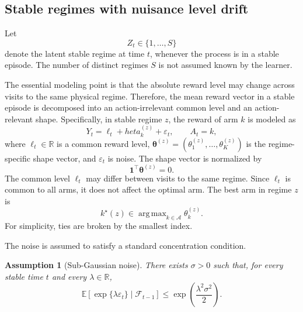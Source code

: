 \documentclass[11pt]{article}
\newtheorem{assumption}{Assumption}
\newcommand{\A}{\mathcal A}
\newcommand{\F}{\mathcal F}
\newcommand{\E}{\mathbb E}
\newcommand{\R}{\mathbb R}
\newcommand{\one}{\bm 1}
\DeclareMathOperator*{\argmax}{arg\,max}
\begin{document}
\subsection{Stable regimes with nuisance level drift}
\label{subsec:stable_regimes}

Let
\begin{equation}
\label{eq:latent_regime}
Z_t\in\{1,\ldots,S\}
\end{equation}
denote the latent stable regime at time $t$, whenever the process is in a stable episode. The number of distinct regimes $S$ is not assumed known by the learner.

The essential modeling point is that the absolute reward level may change across visits to the same physical regime. Therefore, the mean reward vector in a stable episode is decomposed into an action-irrelevant common level and an action-relevant shape. Specifically, in stable regime $z$, the reward of arm $k$ is modeled as
\begin{equation}
\label{eq:stable_reward_model}
Y_t
=
\ell_t+	heta_k^{(z)}+\varepsilon_t,
\qquad A_t=k,
\end{equation}
where $\ell_t\in\R$ is a common reward level, $\bm\theta^{(z)}=(\theta_1^{(z)},\ldots,\theta_K^{(z)})$ is the regime-specific shape vector, and $\varepsilon_t$ is noise. The shape vector is normalized by
\begin{equation}
\label{eq:zero_sum_shape}
\one^\top \bm\theta^{(z)}=0 .
\end{equation}
The common level $\ell_t$ may differ between visits to the same regime. Since $\ell_t$ is common to all arms, it does not affect the optimal arm. The best arm in regime $z$ is
\begin{equation}
\label{eq:best_arm}
k^\star(z)
\in
\argmax_{k\in\A}\theta_k^{(z)}.
\end{equation}
For simplicity, ties are broken by the smallest index.

The noise is assumed to satisfy a standard concentration condition.

\begin{assumption}[Sub-Gaussian noise]
\label{ass:subgaussian}
There exists $\sigma>0$ such that, for every stable time $t$ and every $\lambda\in\R$,
\begin{equation}
\label{eq:subgaussian}
\E\left[
\exp\{\lambda\varepsilon_t\}
\mid \F_{t-1}
\right]
\leq
\exp\left(\frac{\lambda^2\sigma^2}{2}\right).
\end{equation}
\end{assumption}
\end{document}

